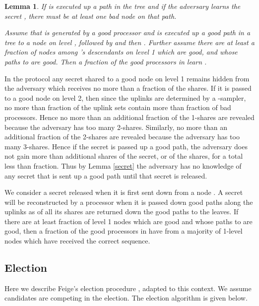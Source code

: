 \documentclass[letterpaper,11pt]{article}
\newtheorem{lemma}{Lemma}
\newcommand{\sq}{\hbox{\rlap{}}}
\newcommand{\qed}{\hspace*{\fill}\sq}
\newenvironment{proof}{\noindent {\bf Proof:}}{\qed\par\vskip 4mm\par}
\begin{document}
\begin{lemma}
\enumerate
\item If   is executed up a path in the tree and if the adversary learns the secret , there must be at least one bad node on that path. 
\item Assume that  is generated by a good processor and  is executed up a good path in a tree to a node  on level , followed by   and then .  Further assume there are at least a  fraction of nodes among 's descendants on level 1 which are good, and whose paths to  are good.  Then a  fraction of the good processors  in  learn .
\end{lemma}

\begin{proof}
In the protocol any secret shared to a good node on level 1 remains hidden from the adversary which receives no more than a  fraction of the shares.  If it is passed to a good node on level 2, then since the uplinks are determined by a -sampler, no more than  fraction of the uplink sets contain more than  fraction of bad processors. Hence   
no more than an additional  fraction of the 1-shares are revealed because the adversary has too many 2-shares.  Similarly, no more than 
an additional  fraction of the 2-shares are revealed because the adversary has too many 3-shares. Hence if the secret is passed up a good path,
the adversary does not gain more than  additional shares of the secret, or  of the shares, for a total less than  fraction. Thus by Lemma \ref{secret} the adversary has no knowledge of any secret that is sent up a good path until that secret is released. 


We consider a secret released  when it is first sent down from a node . A secret will be reconstructed  by a processor when it is passed down good paths along the uplinks as   of all its shares are returned down the good paths to the leaves. If there are at least  fraction of level 1 nodes which are good and whose paths to  are good, then a  fraction of the good processors in  have  from a majority of 1-level nodes which have received the correct sequence. 
\end{proof}



\subsection{Election}\label{election}
Here we describe Feige's election procedure \cite{Feige}, adapted to this context.  We assume  candidates are competing in the election.  The election algorithm is given below.
\end{document}
